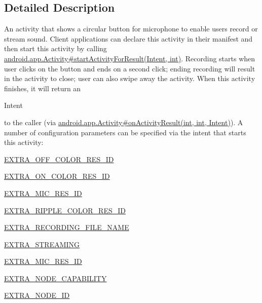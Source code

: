 \subsection{Detailed Description}
An activity that shows a circular button for microphone to enable users record or stream sound. Client applications can declare this activity in their manifest and then start this activity by calling \hyperlink{}{android.\+app.\+Activity\#start\+Activity\+For\+Result(\+Intent, int)}. Recording starts when user clicks on the button and ends on a second click; ending recording will result in the activity to close; user can also swipe away the activity. When this activity finishes, it will return an
\begin{DoxyCode}
Intent 
\end{DoxyCode}
 to the caller (via \hyperlink{}{android.\+app.\+Activity\#on\+Activity\+Result(int, int, Intent)}). A number of configuration parameters can be specified via the intent that starts this activity\+: 
\begin{DoxyItemize}
\item \hyperlink{classcom_1_1google_1_1devrel_1_1wcl_1_1widgets_1_1recording_1_1WclRecorderActivity_a8f7a44233b6b1f98a3c86c032549b1be}{E\+X\+T\+R\+A\+\_\+\+O\+F\+F\+\_\+\+C\+O\+L\+O\+R\+\_\+\+R\+E\+S\+\_\+\+ID} 
\item \hyperlink{classcom_1_1google_1_1devrel_1_1wcl_1_1widgets_1_1recording_1_1WclRecorderActivity_ae793125650ff6c0d3e760e121dd6486c}{E\+X\+T\+R\+A\+\_\+\+O\+N\+\_\+\+C\+O\+L\+O\+R\+\_\+\+R\+E\+S\+\_\+\+ID} 
\item \hyperlink{classcom_1_1google_1_1devrel_1_1wcl_1_1widgets_1_1recording_1_1WclRecorderActivity_a026134c2cb913fb4ed2300ad0dfa0edd}{E\+X\+T\+R\+A\+\_\+\+M\+I\+C\+\_\+\+R\+E\+S\+\_\+\+ID} 
\item \hyperlink{classcom_1_1google_1_1devrel_1_1wcl_1_1widgets_1_1recording_1_1WclRecorderActivity_a4fc46389e5c23a882119e99b1b76e0b2}{E\+X\+T\+R\+A\+\_\+\+R\+I\+P\+P\+L\+E\+\_\+\+C\+O\+L\+O\+R\+\_\+\+R\+E\+S\+\_\+\+ID} 
\item \hyperlink{classcom_1_1google_1_1devrel_1_1wcl_1_1widgets_1_1recording_1_1WclRecorderActivity_ad719ab444b60947d01d2f94c4f5e48c7}{E\+X\+T\+R\+A\+\_\+\+R\+E\+C\+O\+R\+D\+I\+N\+G\+\_\+\+F\+I\+L\+E\+\_\+\+N\+A\+ME} 
\item \hyperlink{classcom_1_1google_1_1devrel_1_1wcl_1_1widgets_1_1recording_1_1WclRecorderActivity_a936b85e81af33279b334a432049c94ee}{E\+X\+T\+R\+A\+\_\+\+S\+T\+R\+E\+A\+M\+I\+NG} 
\item \hyperlink{classcom_1_1google_1_1devrel_1_1wcl_1_1widgets_1_1recording_1_1WclRecorderActivity_a026134c2cb913fb4ed2300ad0dfa0edd}{E\+X\+T\+R\+A\+\_\+\+M\+I\+C\+\_\+\+R\+E\+S\+\_\+\+ID} 
\item \hyperlink{classcom_1_1google_1_1devrel_1_1wcl_1_1widgets_1_1recording_1_1WclRecorderActivity_a7bd0e0e31dfd9a6a1378bc5998470e65}{E\+X\+T\+R\+A\+\_\+\+N\+O\+D\+E\+\_\+\+C\+A\+P\+A\+B\+I\+L\+I\+TY} 
\item \hyperlink{classcom_1_1google_1_1devrel_1_1wcl_1_1widgets_1_1recording_1_1WclRecorderActivity_af9724d687c9bc9c09865a162767767a0}{E\+X\+T\+R\+A\+\_\+\+N\+O\+D\+E\+\_\+\+ID} 
\end{DoxyItemize}

